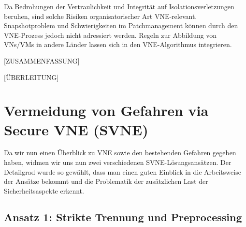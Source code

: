 \documentclass{lni}
\begin{document}
Da Bedrohungen der Vertraulichkeit und Integrität auf Isolationsverletzungen beruhen, sind solche Risiken organisatorischer Art VNE-relevant. Snapshotproblem und Schwierigkeiten im Patchmanagement können durch den VNE-Prozess jedoch nicht adressiert werden.
Regeln zur Abbildung von VNs/VMs in andere Länder lassen sich in den VNE-Algorithmus integrieren.

[ZUSAMMENFASSUNG]

[ÜBERLEITUNG]


\section{Vermeidung von Gefahren via Secure VNE (SVNE)}
\label{sec:svne}
Da wir nun einen Überblick zu VNE sowie den bestehenden Gefahren gegeben haben, widmen wir uns nun zwei verschiedenen SVNE-Lösungsansätzen. Der Detailgrad wurde so gewählt, dass man einen guten Einblick in die Arbeitsweise der Ansätze bekommt und die Problematik der zusätzlichen Last der Sicherheitsaspekte erkennt.

\subsection{Ansatz 1: Strikte Trennung und Preprocessing}
\label{subsec:ansatz1}
\end{document}
